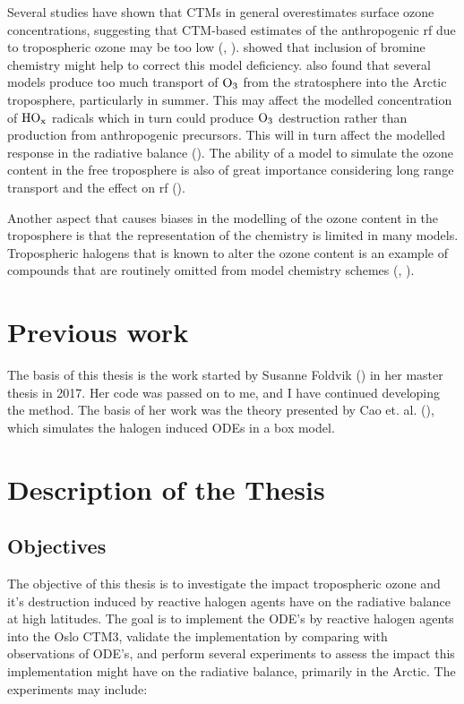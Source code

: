 \medskip

Several studies have shown that CTMs in general overestimates surface ozone concentrations, suggesting that CTM-based estimates of the anthropogenic \acrshort{rf} due to tropospheric ozone may be too low (\cite{WangJacob1998}, \cite{shindell2003}). \cite{Parella} showed that inclusion of bromine chemistry might help to correct this model deficiency. \cite{AMAP2015} also found that several models produce too much transport of $\mathrm{O_3}$ from the stratosphere into the Arctic troposphere, particularly in summer. This may affect the modelled concentration of $\mathrm{HO_x}$ radicals which in turn could produce $\mathrm{O_3}$ destruction rather than production from anthropogenic precursors. This will in turn affect the modelled response in the radiative balance (\cite{AMAP2015}). The ability of a model to simulate the ozone content in the free troposphere is also of great importance considering long range transport and the effect on \acrshort{rf} (\cite{Young2018}).

\medskip

Another aspect that causes biases in the modelling of the ozone content in the troposphere is that the representation of the chemistry is limited in many models. Tropospheric halogens that is known to alter the ozone content is an example of compounds that are routinely omitted from model chemistry schemes (\cite{Young2018}, \cite{Sherwen2017}). 

\section{Previous work}

The basis of this thesis is the work started by Susanne Foldvik (\cite{Susanne}) in her master thesis in 2017. Her code was passed on to me, and I have continued developing the method. The basis of her work was the theory presented by Cao et. al. (\cite{CAO}), which simulates the halogen induced ODEs in a box model.  


\section{Description of the Thesis}

\subsection{Objectives}

The objective of this thesis is to investigate the impact tropospheric ozone and it's destruction induced by reactive halogen agents have on the radiative balance at high latitudes. The goal is to implement the ODE's by reactive halogen agents into the Oslo CTM3, validate the implementation by comparing with observations of ODE's, and perform several experiments to assess the  impact this implementation might have on the radiative balance, primarily in the Arctic. The experiments may include: 

